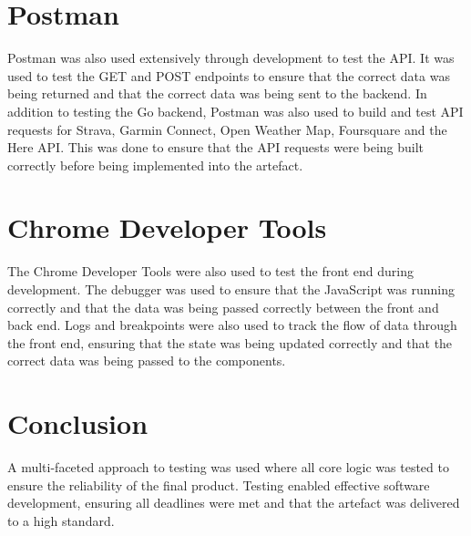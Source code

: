 \section{Postman}
\label{testing:postman}

Postman was also used extensively through development to test the API. It was used to test the GET and POST endpoints to ensure that the correct data was being returned and that the correct data was being sent to the backend. In addition to testing the Go backend, Postman was also used to build and test API requests for Strava, Garmin Connect, Open Weather Map, Foursquare and the Here API. This was done to ensure that the API requests were being built correctly before being implemented into the artefact.

\section{Chrome Developer Tools}
\label{testing:chrome-dev}

The Chrome Developer Tools were also used to test the front end during development. The debugger was used to ensure that the JavaScript was running correctly and that the data was being passed correctly between the front and back end. Logs and breakpoints were also used to track the flow of data through the front end, ensuring that the state was being updated correctly and that the correct data was being passed to the components.

\section{Conclusion}
\label{testing:conclusion}

A multi-faceted approach to testing was used where all core logic was tested to ensure the reliability of the final product. Testing enabled effective software development, ensuring all deadlines were met and that the artefact was delivered to a high standard.